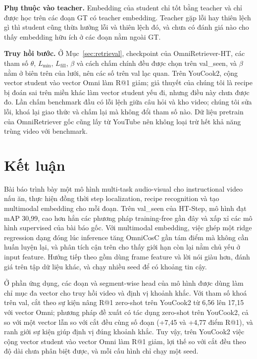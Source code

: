 \documentclass{IEEEtran}
\begin{document}
\textbf{Phụ thuộc vào teacher.} Embedding của student chỉ tốt bằng teacher và chỉ được học trên các đoạn GT có teacher embedding. Teacher gặp lỗi hay thiên lệch gì thì student cũng thừa hưởng lỗi và thiên lệch đó, và chưa có đánh giá nào cho thấy embedding hữu ích ở các đoạn nằm ngoài GT.

\textbf{Truy hồi bước.} Ở Mục~\ref{sec:retrieval}, checkpoint của OmniRetriever-HT, các tham số $\theta$, $L_{\min}$, $L_{\mathrm{fill}}$, $\beta$ và cách chấm chính đều được chọn trên val\_seen, và $\beta$ nằm ở biên trên của lưới, nên các số trên val lạc quan. Trên YouCook2, cộng vector student vào vector Omni làm R@1 giảm; giả thuyết của chúng tôi là recipe bị đoán sai trên miền khác làm vector student yếu đi, nhưng điều này chưa được đo. Lần chấm benchmark đầu có lỗi lệch giữa câu hỏi và kho video; chúng tôi sửa lỗi, khoá lại giao thức và chấm lại mà không đổi tham số nào. Dữ liệu pretrain của OmniRetriever gốc cũng lấy từ YouTube nên không loại trừ hết khả năng trùng video với benchmark.

\section{Kết luận}
Bài báo trình bày một mô hình multi-task audio-visual cho instructional video nấu ăn, thực hiện đồng thời step localization, recipe recognition và tạo multimodal embedding cho mỗi đoạn. Trên val\_seen của HT-Step, mô hình đạt mAP 30,99, cao hơn hẳn các phương pháp training-free gần đây và xấp xỉ các mô hình supervised của bài báo gốc. Với multimodal embedding, việc ghép một ridge regression dạng đóng lúc inference tăng OmniCosC gần tám điểm mà không cần huấn luyện lại, và phân tích cận trên cho thấy giới hạn còn lại nằm chủ yếu ở input feature. Hướng tiếp theo gồm dùng frame feature và lời nói giàu hơn, đánh giá trên tập dữ liệu khác, và chạy nhiều seed để có khoảng tin cậy.

Ở phần ứng dụng, các đoạn và segment-wise head của mô hình được dùng làm chỉ mục đa vector cho truy hồi video và định vị khoảnh khắc. Với tham số khoá trên val, cắt theo sự kiện nâng R@1 zero-shot trên YouCook2 từ 6,56 lên 17,15 với vector Omni; phương pháp đề xuất có tác dụng zero-shot trên YouCook2, cả so với một vector lẫn so với cắt đều cùng số đoạn (+7,45 và +4,77 điểm R@1), và ranh giới sự kiện giúp định vị đúng khoảnh khắc. Tuy vậy, trên YouCook2 việc cộng vector student vào vector Omni làm R@1 giảm, lợi thế so với cắt đều theo độ dài chưa phân biệt được, và mỗi cấu hình chỉ chạy một seed.
\end{document}
